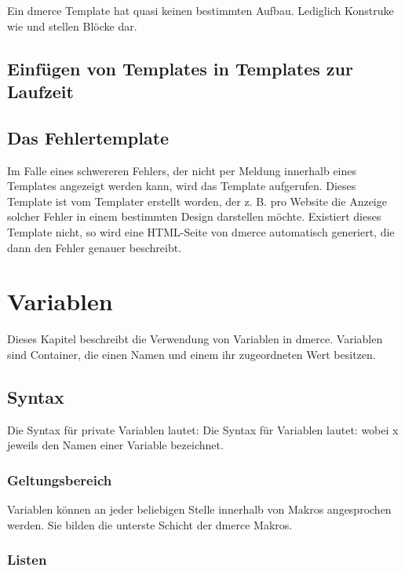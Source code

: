 Ein dmerce Template hat quasi keinen bestimmten Aufbau. Lediglich
Konstruke wie   und
  stellen
Bl\"ocke dar.

\section{Einf\"ugen von Templates in Templates zur Laufzeit}

\section{Das Fehlertemplate}

Im Falle eines schwereren Fehlers, der nicht per Meldung innerhalb
eines Templates angezeigt werden kann, wird das Template
 aufgerufen. Dieses Template ist vom
Templater erstellt worden, der z. B. pro Website die Anzeige solcher
Fehler in einem bestimmten Design darstellen m\"ochte. Existiert
dieses Template nicht, so wird eine HTML-Seite von dmerce automatisch
generiert, die dann den Fehler genauer beschreibt.

\chapter{Variablen}

Dieses Kapitel beschreibt die Verwendung von Variablen in dmerce.
Variablen sind Container, die einen Namen und einem ihr zugeordneten
Wert besitzen.

\newpage
\section{Syntax}

Die Syntax f\"ur private Variablen lautet: 
Die Syntax f\"ur Variablen lautet:  wobei x
jeweils den Namen einer Variable bezeichnet.

\subsection{Geltungsbereich}

Variablen k\"onnen an jeder beliebigen Stelle innerhalb von Makros
angesprochen werden. Sie bilden die unterste Schicht der dmerce
Makros.

\subsection{Listen}

